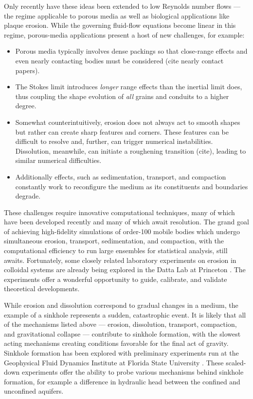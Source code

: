 \documentclass[12pt]{article}
\begin{document}
Only recently have these ideas been extended to low Reynolds number flows  \cite{mitchell2017generalized, Quaife2018} --- the regime applicable to porous media as well as biological applications like plaque erosion. While the governing fluid-flow equations become linear in this regime, porous-media applications present a host of new challenges, for example:
\begin{itemize}
\item Porous media typically involves dense packings so that close-range effects and even nearly contacting bodies must be considered {\color{blue}(cite nearly contact papers)}.
\item The Stokes limit introduces {\em longer} range effects than the inertial limit does, thus coupling the shape evolution of {\em all} grains and conduits to a higher degree.
\item Somewhat counterintuitively, erosion does not always act to smooth shapes but rather can create sharp features and corners. These features can be difficult to resolve and, further, can trigger numerical instabilities. Dissolution, meanwhile, can initiate a roughening transition {\color{blue} (cite)}, leading to similar numerical difficulties.
\item Additionally effects, such as sedimentation, transport, and compaction constantly work to reconfigure the medium as its constituents and boundaries degrade.
\end{itemize}
These challenges require innovative computational techniques, many of which have been developed recently \cite{Quaife2018} and many of which await resolution. The grand goal of achieving high-fidelity simulations of order-100 mobile bodies which undergo simultaneous erosion, transport, sedimentation, and compaction, with the computational efficiency to run large ensembles for statistical analysis, still awaits. Fortunately, some closely related laboratory experiments on erosion in colloidal systems are already being explored in the Datta Lab at Princeton \cite{bizmark2019multiscale}. The experiments offer a wonderful opportunity to guide, calibrate, and validate theoretical developments.

While erosion and dissolution correspond to gradual changes in a medium, the example of a sinkhole represents a sudden, catastrophic event. It is likely that all of the mechanisms listed above --- erosion, dissolution, transport, compaction, and gravitational collapse --- contribute to sinkhole formation, with the slowest acting mechanisms creating conditions favorable for the final act of gravity. Sinkhole formation has been explored with preliminary experiments run at the Geophysical Fluid Dynamics Institute at Florida State University \cite{tao2014experimental}. These scaled-down experiments offer the ability to probe various mechanisms behind sinkhole formation, for example a difference in hydraulic head between the confined and unconfined aquifers. 
\end{document}
